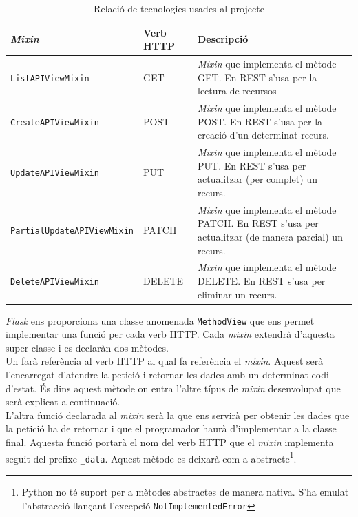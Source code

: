 \begin{table}[here]
 	\begin{center}
 		\begin{tabularx}{\textwidth}{|l|l|X|}
  			\hline
 			\bfseries \emph{Mixin} & \bfseries Verb \ac{HTTP} & \bfseries Descripció \\ \hline
			\texttt{ListAPIViewMixin} &  GET & \emph{Mixin} que implementa el mètode GET. En \ac{REST} s'usa per la lectura de recursos\\ \hline
			\texttt{CreateAPIViewMixin} & POST & \emph{Mixin} que implementa el mètode POST. En \ac{REST} s'usa per la creació d'un determinat recurs.\\ \hline
			\texttt{UpdateAPIViewMixin} & PUT & \emph{Mixin} que implementa el mètode PUT. En \ac{REST} s'usa per actualitzar (per complet) un recurs.\\ \hline
			\texttt{PartialUpdateAPIViewMixin} & PATCH & \emph{Mixin} que implementa el mètode PATCH. En \ac{REST} s'usa per actualitzar (de manera parcial) un recurs.\\ \hline
			\texttt{DeleteAPIViewMixin} & DELETE  & \emph{Mixin} que implementa el mètode DELETE. En \ac{REST} s'usa per eliminar un recurs.\\ \hline
		\end{tabularx}
	\end{center}
	\label{table:mixins}
	\caption{Relació de tecnologies usades al projecte} 
\end{table}

\emph{Flask} ens proporciona una classe anomenada \texttt{MethodView} que ens permet implementar una funció per cada verb \ac{HTTP}. Cada \emph{mixin} extendrà d'aquesta super-classe i es declaràn dos mètodes. \\

Un farà referència al verb \ac{HTTP} al qual fa referència el \emph{mixin}. Aquest serà l'encarregat d'atendre la petició i retornar les dades amb un determinat codi d'estat. És dins aquest mètode on entra l'altre típus de \emph{mixin} desenvolupat que serà explicat a continuació.\\

L'altra funció declarada al \emph{mixin} serà la que ens servirà per obtenir les dades que la petició ha de retornar i que el programador haurà d'implementar a la classe final. Aquesta funció portarà el nom del verb \ac{HTTP} que el \emph{mixin} implementa seguit del prefixe \texttt{\_data}. Aquest mètode es deixarà com a abstracte\footnote{Python no té suport per a mètodes abstractes de manera nativa. S'ha emulat l'abstracció llançant l'excepció \texttt{NotImplementedError}}.\\


